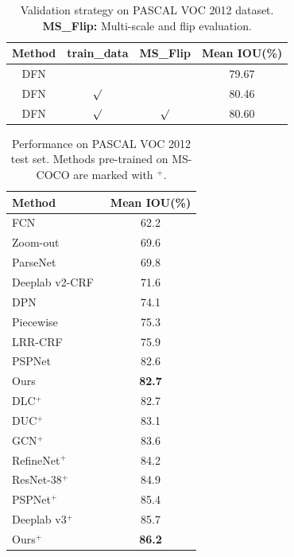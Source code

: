\documentclass[10pt,twocolumn,letterpaper]{article}
\begin{document}
\begin{table}
\begin{center}
\caption{Validation strategy on PASCAL VOC 2012 dataset. \textbf{MS\_Flip:} Multi-scale and flip evaluation.}
\label{tab:evalres}
\begin{tabular}{cccc}
\toprule
Method & train\_data & MS\_Flip & Mean IOU(\%)\\
\hline
\noalign{\smallskip}
DFN & & & 79.67\\
DFN & $\surd$ & & 80.46\\
DFN & $\surd$ & $\surd$ & 80.60\\
\bottomrule
\end{tabular}
\end{center}
\end{table}

 \begin{table}[t]
 \begin{center}
 \caption{Performance on PASCAL VOC 2012 test set. Methods pre-trained on MS-COCO are marked with $^+$.}
 \label{tab:vocresult}
 \begin{tabular}{lc}
 \toprule
 Method & Mean IOU(\%)\\
 \hline
   \noalign{\smallskip}
 FCN~\cite{Long-CVPR-FCN-2015} & 62.2\\
 Zoom-out~\cite{Mostajabi-CVPR-Zoom-2015} & 69.6 \\
 ParseNet~\cite{Liu-ICLR-ParseNet-2016} & 69.8\\
 Deeplab v2-CRF~\cite{Chen-Arxiv-Deeplabv2-2016} & 71.6 \\
 DPN~\cite{Liu-ICCV-DPN-2015} & 74.1 \\
 Piecewise~\cite{Lin-CVPR-Piecewisetraining-2016} & 75.3\\
 LRR-CRF~\cite{Ghiasi-ECCV-LRR-2016} & 75.9\\
 PSPNet~\cite{Zhao-CVPR-PSPNet-2017} & 82.6\\
 \hline
   \noalign{\smallskip}
 Ours & \textbf{82.7}\\ 
 \hline
 \hline
   \noalign{\smallskip}
 DLC$^+$~\cite{Li-CVPR-DLC-2017} & 82.7 \\
 DUC$^+$~\cite{Wang-CVPR-DUC-2017} & 83.1 \\
 GCN$^+$~\cite{Peng-CVPR-Largekernl-2017} & 83.6 \\
 RefineNet$^+$~\cite{Lin-CVPR-Refinenet-2017} & 84.2 \\
 ResNet-38$^+$~\cite{Wu-Arxiv-Resnet38-2016} & 84.9 \\
 PSPNet$^+$~\cite{Zhao-CVPR-PSPNet-2017} & 85.4 \\
 Deeplab v3$^+$~\cite{Chen-Arxiv-Deeplabv3-2017} & 85.7 \\
 \hline
  \noalign{\smallskip}
 Ours$^+$ & \textbf{86.2} \\
 \bottomrule
 \end{tabular}
 \end{center}
 \end{table}
\end{document}
